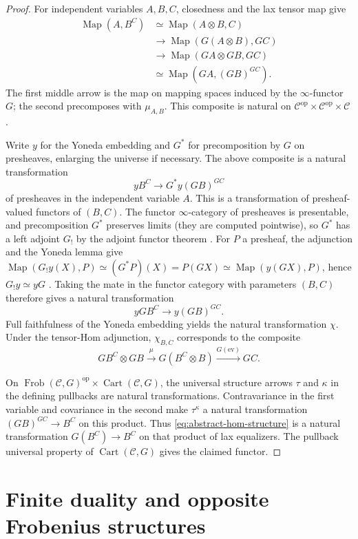 \documentclass[11pt]{amsart}
\newcommand{\cC}{\mathcal{C}}
\newcommand{\Cart}{\operatorname{Cart}}
\newcommand{\Map}{\operatorname{Map}}
\newcommand{\op}{{\operatorname{op}}}
\newcommand{\ev}{\mathrm{ev}}
\newcommand{\Frob}{\operatorname{Frob}}
\theoremstyle{plain}
\theoremstyle{definition}
\numberwithin{equation}{section}
\begin{document}
\begin{proof}
For independent variables $A,B,C$, closedness and the lax tensor map give
\begin{align*}
 \Map(A,B^C)
 &\simeq\Map(A\otimes B,C)\\
 &\longrightarrow\Map(G(A\otimes B),GC)\\
 &\longrightarrow\Map(GA\otimes GB,GC)\\
 &\simeq\Map(GA,(GB)^{GC}).
\end{align*}
The first middle arrow is the map on mapping spaces induced by the $\infty$-functor $G$; the second
precomposes with $\mu_{A,B}$.
This composite is natural on
$\cC^{\op}\times\cC^{\op}\times\cC$.

Write $y$ for the Yoneda embedding and $G^*$ for precomposition by $G$ on presheaves, enlarging the universe if necessary.
The above composite is a natural transformation
\[
 yB^C\longrightarrow G^*y (GB)^{GC}
\]
of presheaves in the independent variable $A$.
This is a transformation of presheaf-valued functors of $(B,C)$.
The functor $\infty$-category of presheaves is presentable, and precomposition $G^*$ preserves limits (they are computed pointwise), so $G^*$ has a left adjoint $G_!$ by the adjoint functor theorem \cite[Corollary 5.5.2.9]{HTT}.
For $P$ a presheaf, the adjunction and the Yoneda lemma give
$\Map(G_!y(X),P)\simeq (G^*P)(X)=P(GX)\simeq\Map(y(GX),P)$,
hence $G_!y\simeq yG$
\cite[Proposition 5.1.3.1]{HTT}.
Taking the mate in the functor category with parameters $(B,C)$
therefore gives a natural transformation
\[
 yG B^C\longrightarrow y (GB)^{GC}.
\]
Full faithfulness of the Yoneda embedding yields the natural transformation $\chi$.
Under the tensor-Hom adjunction, $\chi_{B,C}$ corresponds to the composite
\[
 G B^C\otimes GB\xrightarrow{\mu}
 G(B^C\otimes B)\xrightarrow{G(\ev)}GC.
\]

On $\Frob(\cC,G)^{\op}\times\Cart(\cC,G)$, the universal structure
arrows $\tau$ and $\kappa$ in the defining pullbacks are natural
transformations.
Contravariance in the first variable and covariance in the second make
$\tau^\kappa$ a natural transformation
$(GB)^{GC}\to B^C$ on this product.
Thus \eqref{eq:abstract-hom-structure} is a natural transformation $G(B^C)\to B^C$ on that product of lax equalizers.
The pullback universal property of $\Cart(\cC,G)$ gives the claimed functor.
\end{proof}



\section{Finite duality and opposite Frobenius structures}\label{sec:finite}
\end{document}
